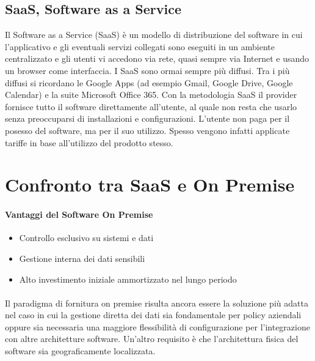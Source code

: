 \subsection{SaaS, Software as a Service}
Il Software as a Service (SaaS) è un modello di distribuzione del software in cui l’applicativo e gli eventuali servizi collegati sono eseguiti in un ambiente centralizzato e gli utenti vi accedono via rete, quasi sempre via Internet e usando un browser come interfaccia. I SaaS sono ormai sempre più diffusi. Tra i più diffusi si ricordano le Google Apps (ad esempio Gmail, Google Drive, Google Calendar) e la suite Microsoft Office 365. Con la metodologia SaaS il provider fornisce tutto il software direttamente all'utente, al quale non resta che usarlo senza preoccuparsi di installazioni e configurazioni. L'utente non paga per il posesso del software, ma per il suo utilizzo. Spesso vengono infatti applicate tariffe in base all'utilizzo del prodotto stesso. 

\section{Confronto tra SaaS e On Premise}
\paragraph{Vantaggi del Software On Premise}
\begin{itemize}
	\item  Controllo esclusivo su sistemi e dati
	\item Gestione interna dei dati sensibili
	\item Alto investimento iniziale ammortizzato nel lungo periodo
\end{itemize}

\paragraph{}
Il paradigma di fornitura on premise risulta ancora essere la soluzione più adatta nel caso in cui la gestione diretta dei dati sia fondamentale per policy aziendali oppure sia necessaria una maggiore flessibilità di configurazione per l’integrazione con altre architetture software. Un'altro requisito è che l'architettura fisica del software sia geograficamente localizzata.
